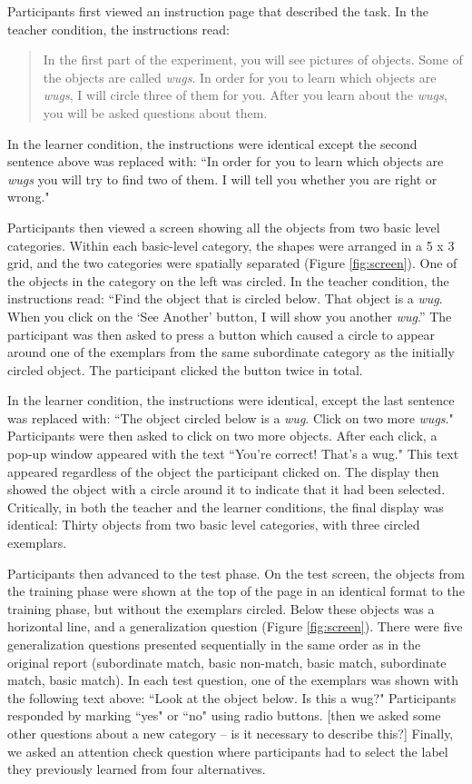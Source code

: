 \documentclass[man]{apa2}
\begin{document}
Participants first viewed an instruction page that described the task. In the teacher condition, the instructions read: 
\begin{quote}
In the first part of the experiment, you will see pictures of objects. Some of the objects are called  \textit{wugs}. In order for you to learn which objects are  \textit{wugs}, I will circle three of them for you. After you learn about the  \textit{wugs}, you will be asked questions about them.
\end{quote}
In the learner condition, the instructions were identical except the second sentence above was replaced with: ``In order for you to learn which objects are  \textit{wugs} you will try to find two of them. I will tell you whether you are right or wrong."

Participants then viewed a screen showing all the objects from two basic level categories. Within each basic-level category, the shapes were arranged in a 5 x 3 grid, and the two categories were spatially separated (Figure \ref{fig:screen}). One of the objects in the category  on the left  was circled. In the teacher condition, the instructions read: ``Find the object that is circled below. That object is a \textit{wug}. When you click on the `See Another' button, I will show you another \textit{wug}.'' The participant  was then asked to press a button which caused a circle to appear around one of the exemplars from the same subordinate category as the initially circled object. The participant clicked the button twice in total. 

In the learner condition, the instructions were identical, except the last sentence was replaced with: ``The object circled below is a \textit{wug}.  Click on two more \textit{wugs}." Participants were then asked to click on two more objects. After each click, a pop-up window appeared with the text ``You're correct! That's a wug." This text appeared regardless of the object the participant clicked on. The display then showed the object with a circle around it to indicate that it had been selected. Critically, in both the teacher and the learner conditions, the final display was identical: Thirty objects from two basic level categories, with three circled exemplars.

Participants then advanced to the test phase. On the test screen, the objects from the training phase were shown at the top of the page in an identical format to the training phase, but without the exemplars circled. Below these objects was a horizontal line, and a generalization question (Figure \ref{fig:screen}). There were five generalization questions presented sequentially in the same order as in the original report (subordinate match, basic non-match, basic match, subordinate match, basic match). In each test question, one of the exemplars was shown with the following text above: ``Look at the object below. Is this a wug?" Participants  responded by marking ``yes" or ``no" using radio buttons.  [then we asked some other questions about a new category -- is it necessary to describe this?] Finally, we asked an attention check question where participants had to select  the label they  previously learned from four alternatives.
\end{document}
